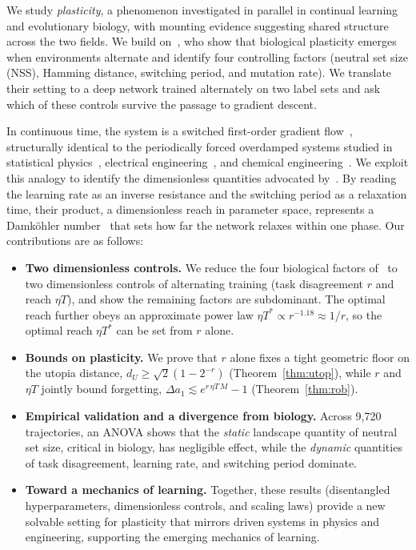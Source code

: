 \documentclass[pmlr]{jmlr} %
\begin{document}
We study \emph{plasticity}, a phenomenon investigated in parallel in continual learning and evolutionary biology, with mounting evidence suggesting shared structure across the two fields. We build on~\citet{PlasticGP}, who show that biological plasticity emerges when environments alternate and identify four controlling factors (neutral set size (NSS), Hamming distance, switching period, and mutation rate). We translate their setting to a deep network trained alternately on two label sets and ask which of these controls survive the passage to gradient descent.

In continuous time, the system is a switched first-order gradient flow~\citep{latz2021}, structurally identical to the periodically forced overdamped systems studied in statistical physics~\citep{joubaud2015, jung1993}, electrical engineering~\citep{oppenheim1997}, and chemical engineering~\citep{levenspiel1999}. We exploit this analogy to identify the dimensionless quantities advocated by~\citet{learningmech26}. By reading the learning rate as an inverse resistance and the switching period as a relaxation time, their product, a dimensionless reach in parameter space, represents a Damk\"ohler number~\citep{levenspiel1999} that sets how far the network relaxes within one phase. Our contributions are as follows:
\begin{itemize}
    \item \textbf{Two dimensionless controls.} We reduce the four biological factors of~\citet{PlasticGP} to two dimensionless controls of alternating training (task disagreement $r$ and reach $\eta T$), and show the remaining factors are subdominant. The optimal reach further obeys an approximate power law $\eta T^{*}\propto r^{-1.18}\approx 1/r$, so the optimal reach $\eta T^*$ can be set from $r$ alone.
    \item \textbf{Bounds on plasticity.} We prove that $r$ alone fixes a tight geometric floor on the utopia distance, $d_U \geq \sqrt{2}(1-2^{-r})$ (Theorem~\ref{thm:utop}), while $r$ and $\eta T$ jointly bound forgetting, $\Delta a_1 \lesssim e^{r\,\eta T\,M}-1$ (Theorem~\ref{thm:rob}).
    \item \textbf{Empirical validation and a divergence from biology.} Across 9{,}720 trajectories, an ANOVA shows that the \emph{static} landscape quantity of neutral set size, critical in biology, has negligible effect, while the \emph{dynamic} quantities of task disagreement, learning rate, and switching period dominate.
    \item \textbf{Toward a mechanics of learning.} Together, these results (disentangled hyperparameters, dimensionless controls, and scaling laws) provide a new solvable setting for plasticity that mirrors driven systems in physics and engineering, supporting the emerging mechanics of learning.
\end{itemize}
\end{document}
